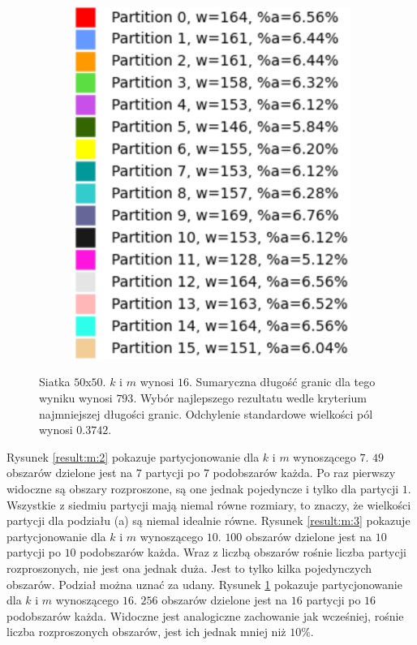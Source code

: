 \begin{figure}[h]
\begin{subfigure}{.33\textwidth}
    \includegraphics[width=0.9\linewidth]{images/results/m/4/results}
    \caption[short]{}
\end{subfigure}
\caption{Siatka $50$x$50$. $k$ i $m$ wynosi $16$.
Sumaryczna długość granic dla tego wyniku wynosi $793$.
Wybór najlepszego rezultatu wedle kryterium najmniejszej długości granic.
Odchylenie standardowe wielkości pól wynosi $0.3742$.}
\label{result:m:4}
\end{figure}
\Floatbarrier


Rysunek \ref{result:m:2} pokazuje partycjonowanie dla $k$ i $m$ wynoszącego $7$.
$49$ obszarów dzielone jest na $7$ partycji po $7$ podobszarów każda.
Po raz pierwszy widoczne są obszary rozproszone, są one jednak pojedyncze i tylko dla partycji $1$.
Wszystkie z siedmiu partycji mają niemal równe rozmiary, to znaczy, że wielkości partycji dla podziału (a) są
niemal idealnie równe.
Rysunek \ref{result:m:3} pokazuje partycjonowanie dla $k$ i $m$ wynoszącego $10$.
$100$ obszarów dzielone jest na $10$ partycji po $10$ podobszarów każda.
Wraz z liczbą obszarów rośnie liczba partycji rozproszonych, nie jest ona jednak duża.
Jest to tylko kilka pojedynczych obszarów.
Podział można uznać za udany.
Rysunek \ref{result:m:4} pokazuje partycjonowanie dla $k$ i $m$ wynoszącego $16$.
$256$ obszarów dzielone jest na $16$ partycji po $16$ podobszarów każda.
Widoczne jest analogiczne zachowanie jak wcześniej, rośnie liczba rozproszonych obszarów, jest ich jednak
mniej niż $10\%$.

